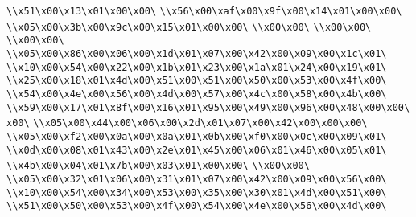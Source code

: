 \verb|\\x51\x00\x13\x01\x00\x00\|\newline
\verb|\\x56\x00\xaf\x00\x9f\x00\x14\x01\x00\x00\|\newline
\verb|\\x05\x00\x3b\x00\x9c\x00\x15\x01\x00\x00\|\newline
\verb|\\x00\x00\|\newline
\verb|\\x00\x00\|\newline
\verb|\\x00\x00\|\newline
\verb|\\x05\x00\x86\x00\x06\x00\x1d\x01\x07\x00\x42\x00\x09\x00\x1c\x01\|\newline
\verb|\\x10\x00\x54\x00\x22\x00\x1b\x01\x23\x00\x1a\x01\x24\x00\x19\x01\|\newline
\verb|\\x25\x00\x18\x01\x4d\x00\x51\x00\x51\x00\x50\x00\x53\x00\x4f\x00\|\newline
\verb|\\x54\x00\x4e\x00\x56\x00\x4d\x00\x57\x00\x4c\x00\x58\x00\x4b\x00\|\newline
\verb|\\x59\x00\x17\x01\x8f\x00\x16\x01\x95\x00\x49\x00\x96\x00\x48\x00\x00\x00\|\newline
\verb|\\x05\x00\x44\x00\x06\x00\x2d\x01\x07\x00\x42\x00\x00\x00\|\newline
\verb|\\x05\x00\xf2\x00\x0a\x00\x0a\x01\x0b\x00\xf0\x00\x0c\x00\x09\x01\|\newline
\verb|\\x0d\x00\x08\x01\x43\x00\x2e\x01\x45\x00\x06\x01\x46\x00\x05\x01\|\newline
\verb|\\x4b\x00\x04\x01\x7b\x00\x03\x01\x00\x00\|\newline
\verb|\\x00\x00\|\newline
\verb|\\x05\x00\x32\x01\x06\x00\x31\x01\x07\x00\x42\x00\x09\x00\x56\x00\|\newline
\verb|\\x10\x00\x54\x00\x34\x00\x53\x00\x35\x00\x30\x01\x4d\x00\x51\x00\|\newline
\verb|\\x51\x00\x50\x00\x53\x00\x4f\x00\x54\x00\x4e\x00\x56\x00\x4d\x00\|\newline
